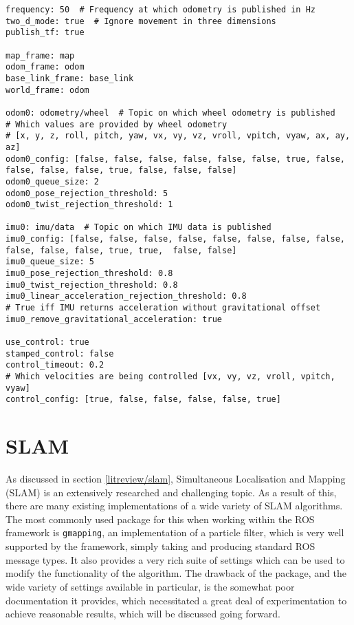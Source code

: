 \begin{lstlisting}[caption={EKF YAML file}, label={lst:ekf_yaml}, style=yaml]
frequency: 50  # Frequency at which odometry is published in Hz
two_d_mode: true  # Ignore movement in three dimensions
publish_tf: true

map_frame: map
odom_frame: odom
base_link_frame: base_link
world_frame: odom

odom0: odometry/wheel  # Topic on which wheel odometry is published
# Which values are provided by wheel odometry
# [x, y, z, roll, pitch, yaw, vx, vy, vz, vroll, vpitch, vyaw, ax, ay, az]
odom0_config: [false, false, false, false, false, false, true, false, false, false, false, true, false, false, false]
odom0_queue_size: 2
odom0_pose_rejection_threshold: 5
odom0_twist_rejection_threshold: 1

imu0: imu/data  # Topic on which IMU data is published
imu0_config: [false, false, false, false, false, false, false, false, false, false, false, true, true,  false, false]
imu0_queue_size: 5
imu0_pose_rejection_threshold: 0.8
imu0_twist_rejection_threshold: 0.8
imu0_linear_acceleration_rejection_threshold: 0.8
# True iff IMU returns acceleration without gravitational offset
imu0_remove_gravitational_acceleration: true

use_control: true
stamped_control: false
control_timeout: 0.2
# Which velocities are being controlled [vx, vy, vz, vroll, vpitch, vyaw]
control_config: [true, false, false, false, false, true]
\end{lstlisting}





\section{SLAM}\label{soft/SLAM}

As discussed in section \ref{litreview/slam}, Simultaneous Localisation and Mapping (SLAM) is an extensively researched and challenging topic. As a result of this, there are many existing implementations of a wide variety of SLAM algorithms. The most commonly used package for this when working within the ROS framework is \verb|gmapping|, an implementation of a particle filter, which is very well supported by the framework, simply taking and producing standard ROS message types. It also provides a very rich suite of settings which can be used to modify the functionality of the algorithm. The drawback of the package, and the wide variety of settings available in particular, is the somewhat poor documentation it provides, which necessitated a great deal of experimentation to achieve reasonable results, which will be discussed going forward.

